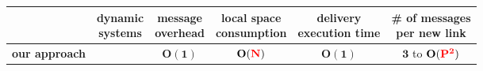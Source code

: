 \scriptsize

\begin{tabularx}{0.95\columnwidth}{@{}Xccccc@{}}
  & \makecell{dynamic\\systems} & \makecell{message\\overhead} & \makecell{local space\\consumption} &  \makecell{delivery\\execution time} & \makecell{\# of messages\\per new link} \\%
  \hline\hline
  \textbf{our approach} & \textbf{\YES{\cmark}} & $\mathbf{O(1)}$ & $\mathbf{O(\textcolor{red}{N})}$ & $\mathbf{O(1)}$ & $\mathbf{3}$ to $\mathbf{O(\textcolor{red}{P^2})}$ \\ 
\end{tabularx}

